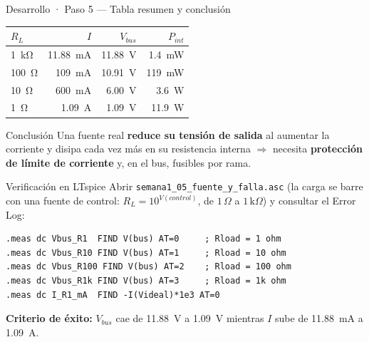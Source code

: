 \documentclass[aspectratio=169]{beamer}
\begin{document}
\begin{frame}{Desarrollo · Paso 5 — Tabla resumen y conclusión}
  \begin{table}
    \small
    \begin{tabular}{lrrr}
      \toprule
      $R_L$ & $I$ & $V_{bus}$ & $P_{int}$ \\
      \midrule
      \SI{1}{\kilo\ohm} & \SI{11.88}{\milli\ampere} & \SI{11.88}{\volt} & \SI{1.4}{\milli\watt} \\
      \SI{100}{\ohm}    & \SI{109}{\milli\ampere}   & \SI{10.91}{\volt} & \SI{119}{\milli\watt} \\
      \SI{10}{\ohm}     & \SI{600}{\milli\ampere}   & \SI{6.00}{\volt}  & \SI{3.6}{\watt} \\
      \SI{1}{\ohm}      & \SI{1.09}{\ampere}        & \SI{1.09}{\volt}  & \SI{11.9}{\watt} \\
      \bottomrule
    \end{tabular}
  \end{table}
  \pause
  \begin{block}{Conclusión}
    Una fuente real \textbf{reduce su tensión de salida} al aumentar la corriente
    y disipa cada vez más en su resistencia interna $\Rightarrow$ necesita
    \textbf{protección de límite de corriente} y, en el bus, fusibles por rama.
  \end{block}
\end{frame}

\begin{frame}[fragile]{Verificación en LTspice}
  Abrir \texttt{semana1\_05\_fuente\_y\_falla.asc} (la carga se barre con una
  fuente de control: $R_L = 10^{V(control)}$, de $1\,\Omega$ a $1\,\text{k}\Omega$)
  y consultar el Error Log:

  \begin{verbatim}
.meas dc Vbus_R1  FIND V(bus) AT=0     ; Rload = 1 ohm
.meas dc Vbus_R10 FIND V(bus) AT=1     ; Rload = 10 ohm
.meas dc Vbus_R100 FIND V(bus) AT=2    ; Rload = 100 ohm
.meas dc Vbus_R1k FIND V(bus) AT=3     ; Rload = 1k ohm
.meas dc I_R1_mA  FIND -I(Videal)*1e3 AT=0
  \end{verbatim}

  \textbf{Criterio de éxito:} $V_{bus}$ cae de \SI{11.88}{\volt} a \SI{1.09}{\volt}
  mientras $I$ sube de \SI{11.88}{\milli\ampere} a \SI{1.09}{\ampere}.
\end{frame}
\end{document}
